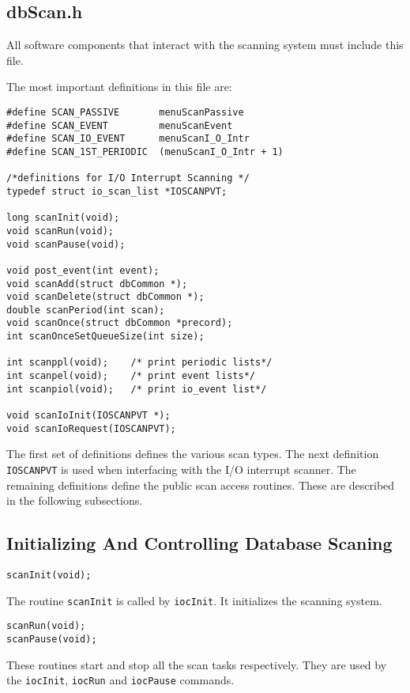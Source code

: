 \subsection{dbScan.h}

All software components that interact with the scanning system must include this file.

The most important definitions in this file are:

\begin{verbatim}#define SCAN_PASSIVE       menuScanPassive
#define SCAN_EVENT         menuScanEvent
#define SCAN_IO_EVENT      menuScanI_O_Intr
#define SCAN_1ST_PERIODIC  (menuScanI_O_Intr + 1)

/*definitions for I/O Interrupt Scanning */
typedef struct io_scan_list *IOSCANPVT;

long scanInit(void);
void scanRun(void);
void scanPause(void);

void post_event(int event);
void scanAdd(struct dbCommon *);
void scanDelete(struct dbCommon *);
double scanPeriod(int scan);
void scanOnce(struct dbCommon *precord);
int scanOnceSetQueueSize(int size);

int scanppl(void);    /* print periodic lists*/
int scanpel(void);    /* print event lists*/
int scanpiol(void);   /* print io_event list*/

void scanIoInit(IOSCANPVT *);
void scanIoRequest(IOSCANPVT);
\end{verbatim}The first set of definitions defines the various scan types. The next definition \verb|IOSCANPVT| is used when interfacing with 
the I/O interrupt scanner. The remaining definitions define the public scan access routines. These are described in the 
following subsections.

\subsection{Initializing And Controlling Database Scaning}

\begin{verbatim}scanInit(void);
\end{verbatim}The routine \verb|scanInit| is called by \verb|iocInit|. It initializes the scanning system.

\begin{verbatim}scanRun(void);
scanPause(void);
\end{verbatim}
These routines start and stop all the scan tasks respectively. They are used by the \verb|iocInit|, \verb|iocRun| and \verb|iocPause| 
commands.\verb||

